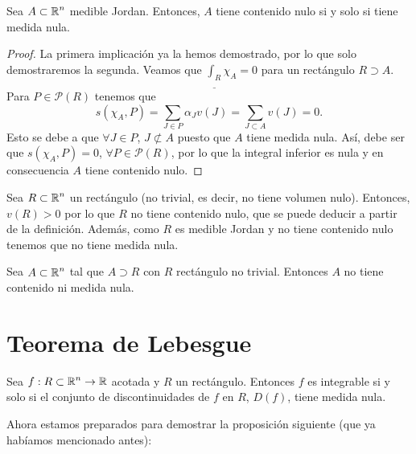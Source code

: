 \begin{prop}
Sea $\displaystyle A \subset \mathbb{R}^{n} $ medible Jordan. Entonces, $\displaystyle A $ tiene contenido nulo si y solo si tiene medida nula.
\end{prop}
\begin{proof}
	La primera implicación ya la hemos demostrado, por lo que solo demostraremos la segunda. Veamos que $\displaystyle \underline{\int _{R} }\chi_{A} = 0 $ para un rectángulo $\displaystyle R \supset A $. Para $\displaystyle P \in \mathcal{P}\left(R\right) $ tenemos que 
	\[s\left(\chi_{A}, P\right)=\sum_{J \in P}\alpha_{J}v\left(J\right)=\sum_{J \subset A}v\left(J\right)=0 .\]
Esto se debe a que $\displaystyle \forall J \in P $, $\displaystyle J \not\subset A $ puesto que $\displaystyle A $ tiene medida nula. Así, debe ser que $\displaystyle s\left(\chi_{A}, P\right) =0$, $\displaystyle \forall P \in \mathcal{P}\left(R\right) $, por lo que la integral inferior es nula y en consecuencia $\displaystyle A $ tiene contenido nulo.	
\end{proof}

\begin{eg}
Sea $\displaystyle R \subset \mathbb{R}^{n} $ un rectángulo (no trivial, es decir, no tiene volumen nulo). Entonces, $\displaystyle v\left(R\right) > 0 $ por lo que $\displaystyle R $ no tiene contenido nulo, que se puede deducir a partir de la definición. Además, como $\displaystyle R $ es medible Jordan y no tiene contenido nulo tenemos que no tiene medida nula.
\end{eg}

\begin{colorary}
Sea $\displaystyle A \subset \mathbb{R}^{n} $ tal que $\displaystyle A \supset R $ con $\displaystyle R  $ rectángulo no trivial. Entonces $\displaystyle A $ no tiene contenido ni medida nula.
\end{colorary}

\section{Teorema de Lebesgue}
\begin{theorem}
Sea $\displaystyle f : R\subset \mathbb{R}^{n} \to \mathbb{R} $ acotada y $\displaystyle R $ un rectángulo. Entonces $\displaystyle f $ es integrable si y solo si el conjunto de discontinuidades de $\displaystyle f $ en $\displaystyle R $, $\displaystyle D\left(f\right) $, tiene medida nula.
\end{theorem}
Ahora estamos preparados para demostrar la proposición siguiente (que ya habíamos mencionado antes):

